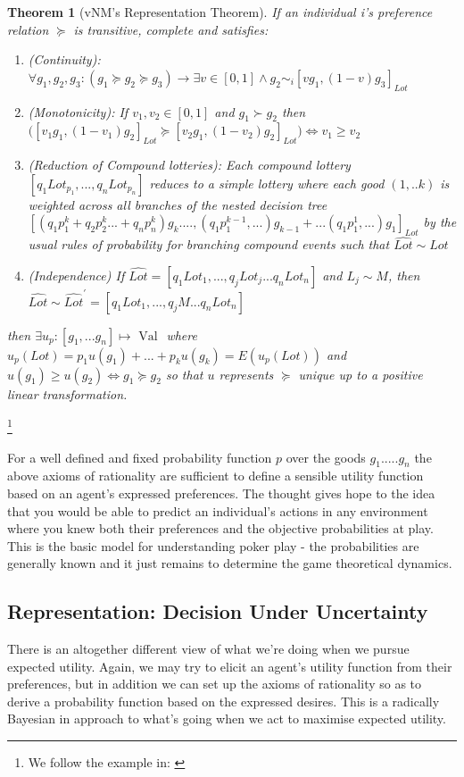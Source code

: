 \documentclass{tufte-handout}
\newtheorem{theo}[section]{Theorem}
\newenvironment{ftheo}[1]
  {\begin{mdframed}
  \sloppy
  \begin{theo}[#1]
  }
  {\end{theo}
\end{mdframed}}
\begin{document}
\begin{ftheo}{vNM's Representation Theorem}
If an individual i's preference relation $\succeq$ is transitive, complete and satisfies: \begin{enumerate}
\item (Continuity): $\forall g_{1} , g_{2} , g_{3} : ( g_{1} \succeq g_{2} \succeq g_{3}) \rightarrow \exists v \in [0, 1] \wedge g_{2} \sim_{i} [v g_{1}, (1-v) g_{3}]_{Lot}$
\item (Monotonicity): If $ v_{1}, v_{2} \in [0, 1]$ and $ g_{1} \succ g_{2}$ then  $ \Big( [ v_{1} g_{1}, (1-v_{1})g_{2}]_{Lot} \succeq [ v_{2} g_{1}, (1-v_{2})g_{2}]_{Lot} \Big) \Leftrightarrow v_{1} \geq v_{2}$
\item (Reduction of Compound lotteries): Each compound lottery ${[q_{1}Lot_{p_{1}}, ...,  q_{n}Lot_{p_{n}}]}$ reduces to a simple lottery where each good $(1, .. k)$ is weighted across all branches of the nested decision tree ${[(q_{1}p^{k}_{1} + q_{2}p^{k}_{2} ... + q_{n}p^{k}_{n})g_{k} .... , (q_{1}p^{k-1}_{1} , ...)g_{k-1} + ... (q_{1}p^{1}_{1} , ...)g_{1}]_{Lot}}$ by the usual rules of probability for branching compound events such that $\widehat{Lot} \sim Lot$ 
\item (Independence) If $\widehat{Lot} = [q_{1}Lot_{1}, ..., q_{j}Lot_{j}...q_{n}Lot_{n}]$ and $L_{j} \sim M$, then $\widehat{Lot} \sim \widehat{Lot}^{'} = [q_{1}Lot_{1}, ..., q_{j}M...q_{n}Lot_{n}]$ 
\end{enumerate}  
then $\exists u_{p} : [ g_{1}, ... g_{n}] \mapsto \text{ Val } $ where 
$ u_{p}(Lot) = p_{1}u(g_{1}) + ... + p_{k}u(g_{k}) = E(u_{p}(Lot))$ and  $u(g_{1}) \geq u(g_{2}) \Leftrightarrow g_{1} \succeq g_{2}$ so that $u$ represents $\succeq$ unique up to a positive linear transformation.
\end{ftheo}\footnote{We follow the example in: \cite{GameTheory}}

\noindent For a well defined and fixed probability function $p$ over the goods $g_{1} ..... g_{n}$ the above axioms of rationality are sufficient to define a sensible utility function based on an agent's expressed preferences. The thought gives hope to the idea that you would be able to predict an individual's actions in any environment where you knew both their preferences and the objective probabilities at play. This is the basic model for understanding poker play - the probabilities are generally known and it just remains to determine the game theoretical dynamics. 

\subsection{Representation: Decision Under Uncertainty}
There is an altogether different view of what we're doing when we pursue expected utility. Again, we may try to elicit an agent's utility function from their preferences, but in addition we can set up the axioms of rationality so as to derive a probability function based on the expressed desires. This is a radically Bayesian in approach to what's going when we act to maximise expected utility. 
\end{document}
